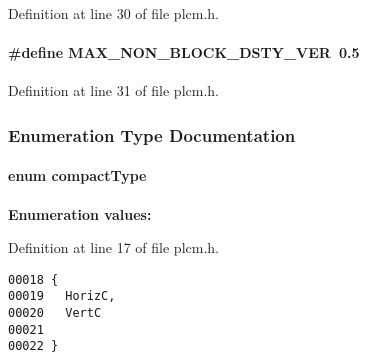 Definition at line 30 of file plcm.h.\label{plcm.h_a1}
\paragraph{\setlength{\rightskip}{0pt plus 5cm}\#define MAX\_\-NON\_\-BLOCK\_\-DSTY\_\-VER\ 0.5}\hfill



Definition at line 31 of file plcm.h.

\subsubsection{Enumeration Type Documentation}
\label{plcm.h_a4}
\paragraph{\setlength{\rightskip}{0pt plus 5cm}enum compact\-Type}\hfill

\begin{Desc}
\item[{\bf Enumeration values:}]\par
\begin{description}
\item[
\label{plcm.h_a2}
{\em Horiz\-C}]\item[
\label{plcm.h_a3}
{\em Vert\-C}]\end{description}
\end{Desc}



Definition at line 17 of file plcm.h.\small\begin{verbatim}00018 {
00019   HorizC,
00020   VertC
00021 
00022 }
\end{verbatim}\normalsize 
